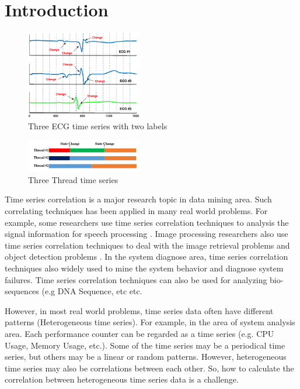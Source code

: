 \section{Introduction}
\label{sec:introduction}


\begin{figure}[t]
\centering
\includegraphics[width=0.45\textwidth]{ECGexp.eps}
\caption{ Three ECG time series with two labels }
\label{fig:ecgexample}
\end{figure}

\begin{figure}[t]
\centering
\includegraphics[width=0.45\textwidth]{HPCExample.pdf}
\caption{Three Thread time series}
\label{fig:hpcexample}
\end{figure}

Time series correlation is a major research topic in data mining area. 
Such correlating techniques has been applied in many real world problems.
For example, some researchers use time series correlation techniques to analysis the signal information for speech processing \cite{rabiner1993fundamentals}.
Image processing researchers also use time series correlation techniques to deal with the image retrieval problems and object detection problems \cite{yang2002detecting, sonka2014image}.
In the system diagnose area\cite{luo2014correlating,sun2014querying}, time series correlation techniques also widely used to mine the system behavior and diagnose system failures. 
Time series correlation techniques can also be used for analyzing bio-sequences (e.g DNA Sequence, etc \cite{mount2001bioinformatics} etc. 

However, in most real world problems, time series data often have different patterns (Heterogeneous time series). For example, in the area of system analysis area. 
Each performance counter can be regarded as a time series (e.g. CPU Usage, Memory Usage, etc.).
Some of the time series may be a periodical time series, but others may be a linear or random patterns. 
However, heterogeneous time series may also be correlations between each other. 
So, how to calculate the correlation between heterogeneous time series data is a challenge. 


